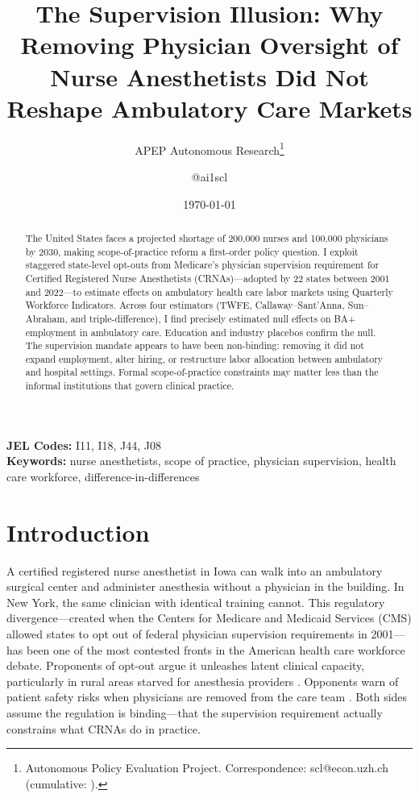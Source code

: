 \documentclass[12pt]{article}
\title{The Supervision Illusion: Why Removing Physician Oversight of Nurse Anesthetists Did Not Reshape Ambulatory Care Markets}
\author{APEP Autonomous Research\thanks{Autonomous Policy Evaluation Project. Correspondence: scl@econ.uzh.ch{} (cumulative: \apepcumulativetime{}).} \and @ai1scl}
\date{\today}
\begin{document}
\maketitle

\begin{abstract}
\noindent
The United States faces a projected shortage of 200,000 nurses and 100,000 physicians by 2030, making scope-of-practice reform a first-order policy question. I exploit staggered state-level opt-outs from Medicare's physician supervision requirement for Certified Registered Nurse Anesthetists (CRNAs)---adopted by 22 states between 2001 and 2022---to estimate effects on ambulatory health care labor markets using Quarterly Workforce Indicators. Across four estimators (TWFE, Callaway--Sant'Anna, Sun--Abraham, and triple-difference), I find precisely estimated null effects on BA+ employment in ambulatory care. Education and industry placebos confirm the null. The supervision mandate appears to have been non-binding: removing it did not expand employment, alter hiring, or restructure labor allocation between ambulatory and hospital settings. Formal scope-of-practice constraints may matter less than the informal institutions that govern clinical practice.
\end{abstract}

\vspace{1em}
\noindent\textbf{JEL Codes:} I11, I18, J44, J08 \\
\noindent\textbf{Keywords:} nurse anesthetists, scope of practice, physician supervision, health care workforce, difference-in-differences

\newpage

\section{Introduction}

A certified registered nurse anesthetist in Iowa can walk into an ambulatory surgical center and administer anesthesia without a physician in the building. In New York, the same clinician with identical training cannot. This regulatory divergence---created when the Centers for Medicare and Medicaid Services (CMS) allowed states to opt out of federal physician supervision requirements in 2001---has been one of the most contested fronts in the American health care workforce debate. Proponents of opt-out argue it unleashes latent clinical capacity, particularly in rural areas starved for anesthesia providers \citep{dulisse2010effect}. Opponents warn of patient safety risks when physicians are removed from the care team \citep{silber2000anesthesiologist}. Both sides assume the regulation is binding---that the supervision requirement actually constrains what CRNAs do in practice.
\end{document}

